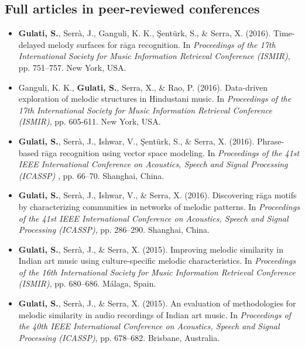 \subsection*{Full articles in peer-reviewed conferences}
\begin{itemize}[leftmargin=*]
	\item \textbf{Gulati, S.}, Serr{\`a}, J., Ganguli, K. K., \c{S}ent{\"u}rk, S., \& Serra, X. (2016). Time-delayed melody surfaces for r\={a}ga recognition. In \textit{Proceedings of the 17th International Society for Music Information Retrieval Conference (ISMIR)}, pp. 751–757. New York, USA.
	\item Ganguli, K. K., \textbf{Gulati, S.}, Serra, X., \& Rao, P. (2016). Data-driven exploration of melodic structures in Hindustani music. In \textit{Proceedings of the 17th International Society for Music Information Retrieval Conference (ISMIR)}, pp. 605-611. New York, USA.
	\item \textbf{Gulati, S.}, Serr{\`a}, J., Ishwar, V., \c{S}ent{\"u}rk, S., \& Serra, X. (2016). Phrase-based r\={a}ga recognition using vector space modeling. In \textit{Proceedings of the 41st IEEE International Conference on Acoustics, Speech and Signal Processing (ICASSP)} , pp. 66–70. Shanghai, China.
	\item \textbf{Gulati, S.}, Serr{\`a}, J., Ishwar, V., \& Serra, X. (2016). Discovering r\={a}ga motifs by characterizing communities in networks of melodic patterns. In \textit{Proceedings of the 41st IEEE International Conference on Acoustics, Speech and Signal Processing (ICASSP)}, pp. 286–290. Shanghai, China.
	\item \textbf{Gulati, S.}, Serr{\`a}, J., \& Serra, X. (2015). Improving melodic similarity in Indian art music using culture-specific melodic characteristics. In \textit{Proceedings of the 16th International Society for Music Information Retrieval Conference (ISMIR)}, pp. 680–686. M{\'a}laga, Spain.
	\item \textbf{Gulati, S.}, Serr{\`a}, J., \& Serra, X. (2015). An evaluation of methodologies for melodic similarity in audio recordings of Indian art music. In \textit{Proceedings of the 40th IEEE International Conference on Acoustics, Speech and Signal Processing (ICASSP)}, pp. 678–682. Brisbane, Australia.

\end{itemize}
